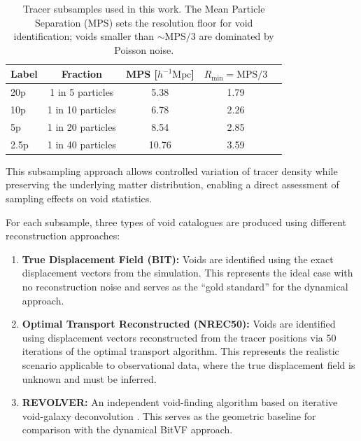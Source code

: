 \documentclass[12pt]{report}
\begin{document}
\begin{table}[H]
    \centering
    \caption{Tracer subsamples used in this work. The Mean Particle Separation (MPS) sets the resolution floor for void identification; voids smaller than $\sim\mathrm{MPS}/3$ are dominated by Poisson noise.}
    \label{tab:subsamples}
    \begin{tabular}{lcccc}
        \toprule
        \textbf{Label} & \textbf{Fraction} & \textbf{MPS [$h^{-1}\mathrm{Mpc}$]} & \textbf{$R_\mathrm{min} = \mathrm{MPS}/3$} \\
        \midrule
        20p  & 1 in 5 particles  & 5.38  & 1.79 \\
        10p  & 1 in 10 particles & 6.78  & 2.26 \\
        5p   & 1 in 20 particles & 8.54  & 2.85 \\
        2.5p & 1 in 40 particles & 10.76 & 3.59 \\
        \bottomrule
    \end{tabular}
\end{table}

This subsampling approach allows controlled variation of tracer density while preserving the underlying matter distribution, enabling a direct assessment of sampling effects on void statistics.

For each subsample, three types of void catalogues are produced using different reconstruction approaches:

\begin{enumerate}
    \item \textbf{True Displacement Field (BIT):} Voids are identified using the exact displacement vectors from the simulation. This represents the ideal case with no reconstruction noise and serves as the ``gold standard'' for the dynamical approach.

    \item \textbf{Optimal Transport Reconstructed (NREC50):} Voids are identified using displacement vectors reconstructed from the tracer positions via 50 iterations of the optimal transport algorithm. This represents the realistic scenario applicable to observational data, where the true displacement field is unknown and must be inferred.

    \item \textbf{REVOLVER:} An independent void-finding algorithm based on iterative void-galaxy deconvolution \citep{Nadathur2019}. This serves as the geometric baseline for comparison with the dynamical BitVF approach.
\end{enumerate}
\end{document}
